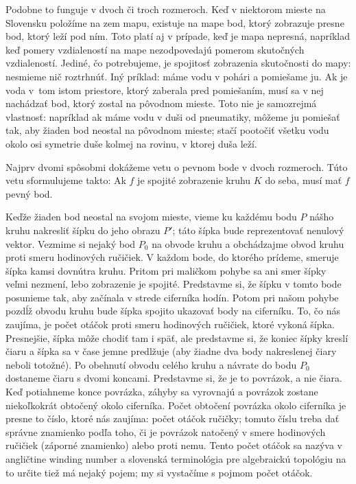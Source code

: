 \documentclass[a4paper]{article}
\begin{document}
Podobne to funguje v dvoch či troch rozmeroch. Keď v niektorom mieste na Slovensku položíme na zem mapu, existuje na mape bod, ktorý zobrazuje presne bod, ktorý leží pod ním. Toto platí aj v prípade, keď je mapa nepresná, napríklad keď pomery vzdialeností na mape nezodpovedajú pomerom skutočných vzdialeností. Jediné, čo potrebujeme, je spojitosť zobrazenia skutočnosti do mapy: nesmieme nič roztrhnúť. Iný príklad: máme vodu v pohári a pomiešame ju. Ak je voda v~tom istom priestore, ktorý zaberala pred pomiešaním, musí sa v nej nachádzať bod, ktorý zostal na pôvodnom mieste. Toto nie je samozrejmá vlastnosť: napríklad ak máme vodu v duši od pneumatiky, môžeme ju pomiešať tak, aby žiaden bod neostal na pôvodnom mieste; stačí pootočiť všetku vodu okolo osi symetrie duše kolmej na rovinu, v ktorej duša leží.

Najprv dvomi spôsobmi dokážeme vetu o pevnom bode v dvoch rozmeroch. Túto vetu sformulujeme takto: Ak $f$ je spojité zobrazenie kruhu $K$ do seba, musí mať $f$ pevný bod.

Keďže žiaden bod neostal na svojom mieste, vieme ku každému bodu $P$ nášho kruhu nakresliť šípku do jeho obrazu $P'$; táto šípka bude reprezentovať nenulový vektor.
Vezmime si nejaký bod $P_0$ na obvode kruhu a obchádzajme obvod kruhu proti smeru hodinových ručičiek. V každom bode, do ktorého prídeme, smeruje šípka kamsi dovnútra kruhu. Pritom pri maličkom pohybe sa ani smer šípky veľmi nezmení, lebo zobrazenie je spojité. Predstavme si, že šípku v tomto bode posunieme tak, aby začínala v strede ciferníka hodín. Potom pri našom pohybe pozdĺž obvodu kruhu bude šípka spojito ukazovať body na ciferníku. To, čo nás zaujíma, je počet otáčok proti smeru hodinových ručičiek, ktoré vykoná šípka. Presnejšie, šípka môže chodiť tam i späť, ale predstavme si, že koniec šípky kreslí čiaru a šípka sa v čase jemne predlžuje (aby žiadne dva body nakreslenej čiary neboli totožné). Po obehnutí obvodu celého kruhu a návrate do bodu $P_0$ dostaneme čiaru s dvomi koncami. Predstavme si, že je to povrázok, a nie čiara. Keď potiahneme konce povrázka, záhyby sa vyrovnajú a povrázok zostane niekoľkokrát obtočený okolo ciferníka. Počet obtočení povrázka okolo ciferníka je presne to číslo, ktoré nás zaujíma: počet otáčok ručičky; tomuto číslu treba dať správne znamienko podľa toho, či je povrázok natočený v smere hodinových ručičiek (záporné znamienko) alebo proti nemu.
Tento počet otáčok sa nazýva v angličtine winding number a slovenská terminológia pre algebraickú topológiu na to určite tiež má nejaký pojem; my si vystačíme s pojmom počet otáčok.
\end{document}
